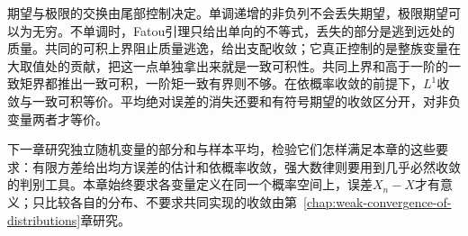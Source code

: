 期望与极限的交换由尾部控制决定。单调递增的非负列不会丢失期望，极限期望可以为无穷。不单调时，Fatou引理只给出单向的不等式，丢失的部分是逃到远处的质量。共同的可积上界阻止质量逃逸，给出支配收敛；它真正控制的是整族变量在大取值处的贡献，把这一点单独拿出来就是一致可积性。共同上界和高于一阶的一致矩界都推出一致可积，一阶矩一致有界则不够。在依概率收敛的前提下，$L^{1}$收敛与一致可积等价。平均绝对误差的消失还要和有符号期望的收敛区分开，对非负变量两者才等价。

下一章研究独立随机变量的部分和与样本平均，检验它们怎样满足本章的这些要求：有限方差给出均方误差的估计和依概率收敛，强大数律则要用到几乎必然收敛的判别工具。本章始终要求各变量定义在同一个概率空间上，误差$X_n-X$才有意义；只比较各自的分布、不要求共同实现的收敛由第~\ref{chap:weak-convergence-of-distributions}章研究。
